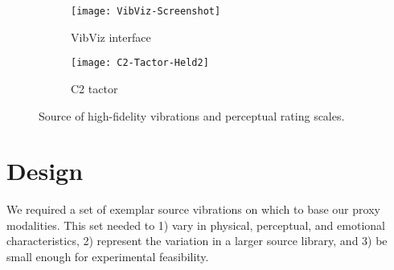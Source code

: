 \begin{figure}[tb]
\centering
\begin{subfigure}{0.28\textwidth}
        		\centering
	    	 \texttt{[image: VibViz-Screenshot]}
            \caption{VibViz interface ~\cite{Seifi2015}}
            \label{fig:vibviz}
         \end{subfigure}
         \qquad
	\begin{subfigure}{0.19\textwidth}
    	\centering
     	 \texttt{[image: C2-Tactor-Held2]}
            \caption{C2 tactor}
            \label{fig:c2tactor}
         \end{subfigure}
            \label{fig:approach}
            \caption{Source of high-fidelity vibrations and perceptual rating scales.}
\end{figure}


\section{Design}%


We required a set of exemplar source vibrations on which to base our proxy modalities. 
This set needed to
1) vary in physical, perceptual, and %
emotional characteristics,
2) represent the variation in a larger source library, and
3) be small enough for experimental feasibility.


